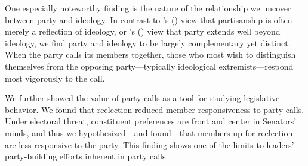 \documentclass[12pt]{article}
\def\citeapos#1{\citeauthor{#1}'s (\citeyear{#1})}
\begin{document}
One especially noteworthy finding is the nature of the relationship we uncover
between party and ideology.
In contrast to \citeapos{Krehbiel:1993} view that partisanship is often merely
a reflection of ideology, or \citeapos{Lee:2009} view that party extends well
beyond ideology, we find party and ideology to be largely complementary yet
distinct.
When the party calls its members together, those who most wish to distinguish
themselves from the opposing party---typically ideological extremists---respond
most vigorously to the call.

We further showed the value of party calls as a tool for studying legislative
behavior.
We found that reelection reduced member responsiveness to party calls.
Under electoral threat, constituent preferences are front and center in
Senators' minds, and thus we hypothesized---and found---that members up for
reelection are less responsive to the party.
This finding shows one of the limits to leaders' party-building efforts
inherent in party calls.




\end{document}
